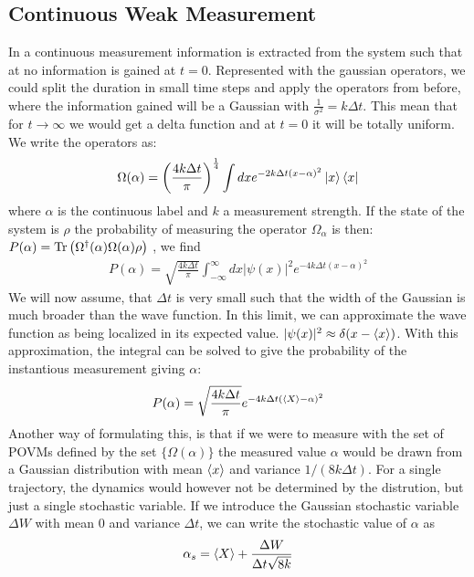 \subsection{Continuous Weak Measurement}\label{sec:continuous_weak_measurement}
In a continuous measurement information is extracted from the system such that at no information is gained at $t=0$. Represented with the gaussian operators, we could split the duration in small time steps and apply the operators from before, where the information gained will be a Gaussian with $\frac{1}{\sigma^2} = k\Delta t$. This mean that for $t\to\infty$ we would get a delta function and at $t=0$ it will be totally uniform. We write the operators as:
\begin{equation}
    \Omega(\alpha) = \left(\frac{4 k \Delta t}{\pi}\right)^\frac14 \int dx e^{-2k\Delta t (x - \alpha)^2} \ket{x}\bra{x}
\end{equation}
where $\alpha$ is the continuous label and $k$ a measurement strength. If the state of the system is $\rho$ the probability of measuring the operator $\Omega_\alpha$ is then: $P(\alpha) = \Tr\left(\Omega^\dagger(\alpha) \Omega(\alpha) \rho \right)$ , we find 
\begin{align}
    P(\alpha) = \sqrt{\frac{4 k \Delta t}{\pi}} \int_{-\infty}^{\infty} dx |\psi(x)|^2 e^{-4k\Delta t (x - \alpha)^2}
\end{align}
We will now assume, that $\Delta t$ is very small such that the width of the Gaussian is much broader than the wave function. In this limit, we can approximate the wave function as being localized in its expected value. $|\psi(x)|^2 \approx \delta(x-\expval{x})$. With this approximation, the integral can be solved to give the probability of the instantious measurement giving $\alpha$:
\begin{equation}\label{eq:probability_of_alpha_gaussian}
    P(\alpha) = \sqrt{\frac{4 k \Delta t}{\pi}}  e^{-4k\Delta t (\expval{X} - \alpha)^2}
\end{equation}
Another way of formulating this, is that if we were to measure with the set of POVMs defined by the set $\{\Omega(\alpha)\}$ the measured value $\alpha$ would be drawn from a Gaussian distribution with mean $\expval{x}$ and variance $1 / (8k\Delta t)$. For a single trajectory, the dynamics would however not be determined by the distrution, but just a single stochastic variable. If we introduce the Gaussian stochastic variable $\Delta W$ with mean 0 and variance $\Delta t$, we can write the stochastic value of $\alpha$ as
\begin{equation}
    \alpha_s = \expval{X} + \frac{\Delta W}{\Delta t \sqrt{8k}}
\end{equation}

